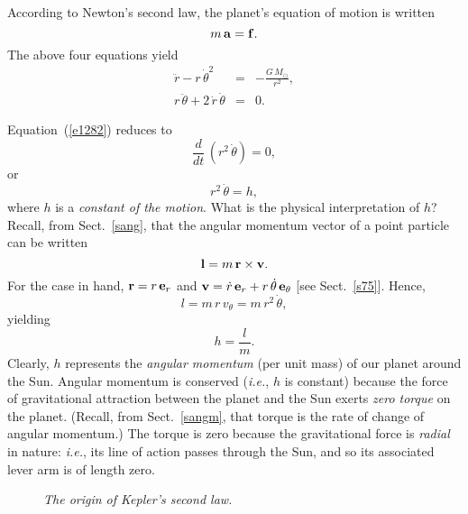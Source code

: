 According to Newton's second law, the planet's equation of motion is written
\begin{equation}
m\,{\bf a} = {\bf f}.
\end{equation}
The above four equations yield
\begin{eqnarray}
 \ddot{r} - r\,\dot{\theta}^2 &=& - \frac{G\,M_\odot}{r^2},\label{e1227}\\[0.5ex]
 r\,\ddot{\theta} + 2\,\dot{r}\,\dot{\theta} &=& 0.\label{e1282}
\end{eqnarray}

Equation~(\ref{e1282}) reduces to
\begin{equation}
\frac{d}{dt}\,(r^2\,\dot{\theta}) = 0,
\end{equation}
or
\begin{equation}
r^2\,\dot{\theta} = h,
\end{equation}
where $h$ is a {\em constant of the motion}. What is the physical interpretation of $h$? Recall,
from Sect.~\ref{sang}, that the angular momentum vector of a point particle can be written
\begin{equation}
{\bf l} = m\,{\bf r}\times{\bf v}.
\end{equation}
For the case in hand, ${\bf r} = r\,{\bf e}_r$ and ${\bf v} = \dot{r}\,{\bf e}_r+r\,\dot{\theta}\,
{\bf e}_\theta$ [see Sect.~\ref{s75}]. Hence,
\begin{equation}
l = m\,r\,v_\theta = m\,r^2\,\dot{\theta},
\end{equation}
yielding
\begin{equation}
h = \frac{l}{m}.
\end{equation}
Clearly,  $h$ represents the {\em angular momentum} (per unit mass) of our planet around the Sun.
Angular momentum is conserved ({\em i.e.}, $h$ is constant)
because the force of gravitational attraction between the planet and
the Sun exerts {\em zero torque} on the planet. (Recall, from Sect.~\ref{sangm}, that torque is the 
rate of change of angular momentum.)
The torque is zero because the gravitational force is {\em radial} in nature: {\em i.e.},
its line of action passes through the Sun, and so its associated lever arm is of  length zero.

\begin{figure}
\epsfysize=1.5in
\centerline{}
\caption{\em The origin of Kepler's second law.}\label{f107}  
\end{figure}

